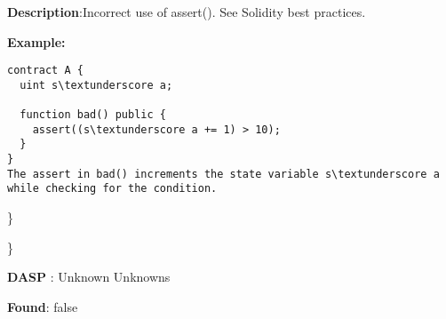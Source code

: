 \documentclass{article}
\begin{document}
\textbf{Description}:Incorrect use of assert(). See Solidity best practices.


\textbf{Example:} 
\begin{verbatim}
contract A {
  uint s\textunderscore a;

  function bad() public {
    assert((s\textunderscore a += 1) > 10);
  }
}
The assert in bad() increments the state variable s\textunderscore a while checking for the condition.

\end{verbatim}\} 

\} 

\textbf{DASP} : Unknown Unknowns

\textbf{Found}: false
\end{document}
